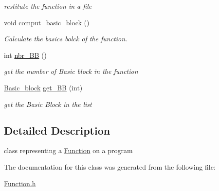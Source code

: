 \begin{DoxyCompactItemize}
\begin{DoxyCompactList}\small\item\em restitute the function in a file \item\end{DoxyCompactList}\item 
\hypertarget{classFunction_a6094f123294ccbb891fa4145fd5b1b0a}{
void \hyperlink{classFunction_a6094f123294ccbb891fa4145fd5b1b0a}{comput\_\-basic\_\-block} ()}
\label{classFunction_a6094f123294ccbb891fa4145fd5b1b0a}

\begin{DoxyCompactList}\small\item\em Calculate the basics bolck of the function. \item\end{DoxyCompactList}\item 
\hypertarget{classFunction_a4ddde4ac1ff488dfcbfcaee71f727a48}{
int \hyperlink{classFunction_a4ddde4ac1ff488dfcbfcaee71f727a48}{nbr\_\-BB} ()}
\label{classFunction_a4ddde4ac1ff488dfcbfcaee71f727a48}

\begin{DoxyCompactList}\small\item\em get the number of Basic block in the function \item\end{DoxyCompactList}\item 
\hypertarget{classFunction_ad145d230633705dc2a51789d11fe8649}{
\hyperlink{classBasic__block}{Basic\_\-block} \hyperlink{classFunction_ad145d230633705dc2a51789d11fe8649}{get\_\-BB} (int)}
\label{classFunction_ad145d230633705dc2a51789d11fe8649}

\begin{DoxyCompactList}\small\item\em get the Basic Block in the list \item\end{DoxyCompactList}\end{DoxyCompactItemize}


\subsection{Detailed Description}
class representing a \hyperlink{classFunction}{Function} on a program 

The documentation for this class was generated from the following file:\begin{DoxyCompactItemize}
\item 
\hyperlink{Function_8h}{Function.h}\end{DoxyCompactItemize}
